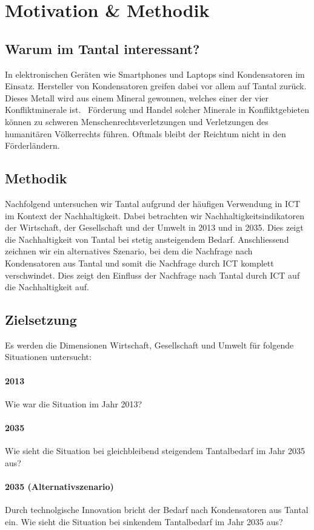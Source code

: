 \section{Motivation \& Methodik}\label{sec:motivation}

\subsection{Warum im Tantal interessant?}

In elektronischen Geräten wie Smartphones und Laptops sind Kondensatoren im Einsatz.
Hersteller von Kondensatoren greifen dabei vor allem auf Tantal zurück. Dieses Metall wird aus einem Mineral gewonnen, welches einer der vier Konfliktminerale ist.~\cite{why_tantal}
Förderung und Handel solcher Minerale in Konfliktgebieten können zu schweren Menschenrechtsverletzungen und Verletzungen des humanitären Völkerrechts führen. Oftmals bleibt der Reichtum nicht in den Förderländern.
~\cite{conflict_minerals}

\subsection{Methodik}

Nachfolgend untersuchen wir Tantal aufgrund der häufigen Verwendung in ICT im Kontext der Nachhaltigkeit. Dabei betrachten wir Nachhaltigkeitsindikatoren der Wirtschaft, der Gesellschaft und der Umwelt in 2013 und in 2035. Dies zeigt die Nachhaltigkeit von Tantal bei stetig ansteigendem Bedarf.
Anschliessend zeichnen wir ein alternatives Szenario, bei dem die Nachfrage nach Kondensatoren aus Tantal und somit die Nachfrage durch ICT komplett verschwindet. Dies zeigt den Einfluss der Nachfrage nach Tantal durch ICT auf die Nachhaltigkeit auf.

\subsection{Zielsetzung}

Es werden die Dimensionen Wirtschaft, Gesellschaft und Umwelt für folgende Situationen untersucht:

\paragraph{2013}
Wie war die Situation im Jahr 2013?
\paragraph{2035}
Wie sieht die Situation bei gleichbleibend steigendem Tantalbedarf im Jahr 2035 aus?
\paragraph{2035 (Alternativszenario)}
Durch technolgische Innovation bricht der Bedarf nach Kondensatoren aus Tantal ein. Wie sieht die Situation bei sinkendem Tantalbedarf im Jahr 2035 aus?
